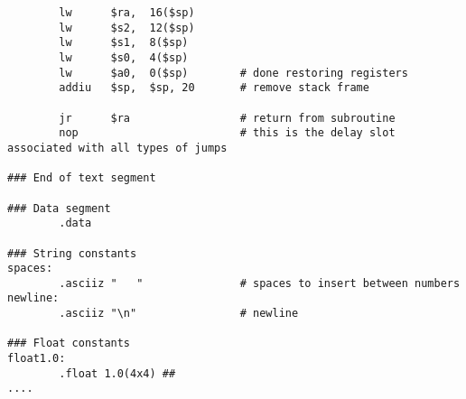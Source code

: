 \begin{verbatim}
        lw      $ra,  16($sp)
        lw      $s2,  12($sp)
        lw      $s1,  8($sp)
        lw      $s0,  4($sp)
        lw      $a0,  0($sp)        # done restoring registers
        addiu   $sp,  $sp, 20       # remove stack frame

        jr      $ra                 # return from subroutine
        nop                         # this is the delay slot associated with all types of jumps

### End of text segment

### Data segment 
        .data
        
### String constants
spaces:
        .asciiz "   "               # spaces to insert between numbers
newline:
        .asciiz "\n"                # newline

### Float constants
float1.0:
        .float 1.0(4x4) ##
....

\end{verbatim}